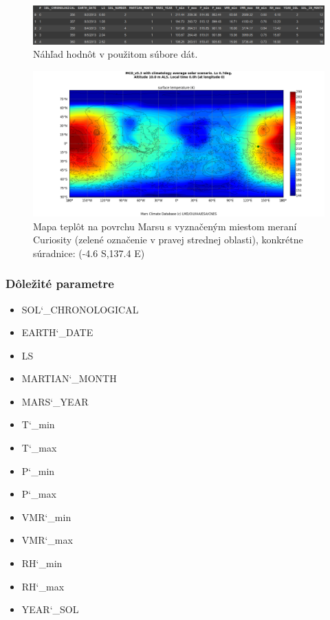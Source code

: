 \begin{figure}[!htbp]
  \centering
  \includegraphics[width=14cm]{img/datase.png}
  \caption{Náhľad hodnôt v použitom súbore dát.}
  \label{dataset}
\end{figure}

\begin{figure}[!htbp]
  \centering
  \includegraphics[width=14cm]{img/surface_temp.png}
  \caption{Mapa teplôt na povrchu Marsu s vyznačeným miestom meraní Curiosity (zelené označenie v pravej strednej oblasti), konkrétne súradnice: (-4.6 S,137.4 E)}
  \label{temp}
\end{figure}
\newpage



\subsubsection{Dôležité parametre}
\begin{itemize}
    \item SOL\char`_CHRONOLOGICAL
    \item EARTH\char`_DATE
    \item LS
    \item MARTIAN\char`_MONTH
    \item MARS\char`_YEAR
    \item T\char`_min
    \item T\char`_max
    \item P\char`_min
    \item P\char`_max
    \item VMR\char`_min
    \item VMR\char`_max
    \item RH\char`_min
    \item RH\char`_max
    \item YEAR\char`_SOL
\end{itemize}




